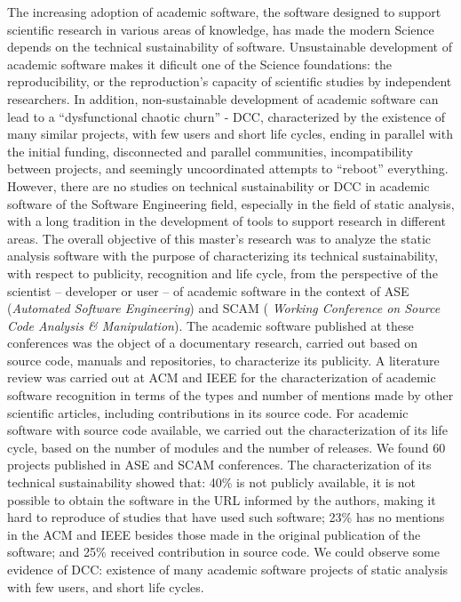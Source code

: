 The increasing adoption of academic software, the software designed to
support scientific research in various areas of knowledge, has made the
modern Science depends on the technical sustainability of software.
%
Unsustainable development of academic software makes it dificult one of the
Science foundations: the reproducibility, or the reproduction's capacity of
scientific studies by independent researchers.
%
In addition, non-sustainable development of academic software can lead to a
``dysfunctional chaotic churn'' - DCC, characterized by the existence of many
similar projects, with few users and short life cycles, ending in parallel with
the initial funding, disconnected and parallel communities, incompatibility
between projects, and seemingly uncoordinated attempts to ``reboot''
everything.
%
However, there are no studies on technical sustainability or DCC in academic
software of the Software Engineering field, especially in the field of static
analysis, with a long tradition in the development of tools to support research
in different areas.
%
The overall objective of this master's research was to analyze the static
analysis software with the purpose of characterizing its technical
sustainability, with respect to publicity, recognition and life cycle, from the
perspective of the scientist -- developer or user -- of academic software in
the context of ASE ({\it Automated Software Engineering}) and SCAM ({\it
Working Conference on Source Code Analysis \& Manipulation}).
%
The academic software published at these conferences was the object of a
documentary research, carried out based on source code, manuals and
repositories, to characterize its publicity.
%
A literature review was carried out at ACM and IEEE for the characterization of
academic software recognition in terms of the types and number of mentions made
by other scientific articles, including contributions in its source code.
%
For academic software with source code available, we carried out the
characterization of its life cycle, based on the number of modules and the
number of releases.
%
We found 60 projects published in ASE and SCAM conferences.
%
The characterization of its technical sustainability showed that: 40\% is not
publicly available, it is not possible to obtain the software in the URL
informed by the authors, making it hard to reproduce of studies that have used
such software;
%
23\% has no mentions in the ACM and IEEE besides those made in the original
publication of the software; and 25\% received contribution in source code.
%
We could observe some evidence of DCC: existence of many academic software
projects of static analysis with few users, and short life cycles.
